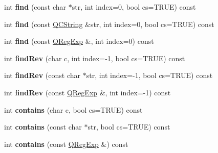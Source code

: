 \begin{DoxyCompactItemize}
\item 
\hypertarget{class_q_c_string_ae601972d1298a1aa17a9d2985fad64cc}{int {\bfseries find} (const char $\ast$str, int index=0, bool cs=T\-R\-U\-E) const }\label{class_q_c_string_ae601972d1298a1aa17a9d2985fad64cc}

\item 
\hypertarget{class_q_c_string_a899937d9bf8a10829d2f9fb1c347c993}{int {\bfseries find} (const \hyperlink{class_q_c_string}{Q\-C\-String} \&str, int index=0, bool cs=T\-R\-U\-E) const }\label{class_q_c_string_a899937d9bf8a10829d2f9fb1c347c993}

\item 
\hypertarget{class_q_c_string_a7d7d4fe2b8d9279521d5b89fbde1052d}{int {\bfseries find} (const \hyperlink{class_q_reg_exp}{Q\-Reg\-Exp} \&, int index=0) const }\label{class_q_c_string_a7d7d4fe2b8d9279521d5b89fbde1052d}

\item 
\hypertarget{class_q_c_string_a1c9c5fa7edcc9f59b7ad419554a31270}{int {\bfseries find\-Rev} (char c, int index=-\/1, bool cs=T\-R\-U\-E) const }\label{class_q_c_string_a1c9c5fa7edcc9f59b7ad419554a31270}

\item 
\hypertarget{class_q_c_string_aae624bd3ceb0e99a50f3145450c9657b}{int {\bfseries find\-Rev} (const char $\ast$str, int index=-\/1, bool cs=T\-R\-U\-E) const }\label{class_q_c_string_aae624bd3ceb0e99a50f3145450c9657b}

\item 
\hypertarget{class_q_c_string_ac8a7fd641cbd6e1d9704c2a37547f7dd}{int {\bfseries find\-Rev} (const \hyperlink{class_q_reg_exp}{Q\-Reg\-Exp} \&, int index=-\/1) const }\label{class_q_c_string_ac8a7fd641cbd6e1d9704c2a37547f7dd}

\item 
\hypertarget{class_q_c_string_a2ff9ac285923aa8c6f798a030730b80d}{int {\bfseries contains} (char c, bool cs=T\-R\-U\-E) const }\label{class_q_c_string_a2ff9ac285923aa8c6f798a030730b80d}

\item 
\hypertarget{class_q_c_string_abe7452ce01e2396702f7f158ebf38d22}{int {\bfseries contains} (const char $\ast$str, bool cs=T\-R\-U\-E) const }\label{class_q_c_string_abe7452ce01e2396702f7f158ebf38d22}

\item 
\hypertarget{class_q_c_string_aedd4a9c1e1ccbd48eec982dd9e6abb44}{int {\bfseries contains} (const \hyperlink{class_q_reg_exp}{Q\-Reg\-Exp} \&) const }\label{class_q_c_string_aedd4a9c1e1ccbd48eec982dd9e6abb44}


\end{DoxyCompactItemize}
